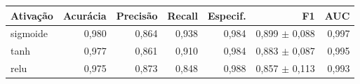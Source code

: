 \begin{tabular}{lrrrrrr}
\toprule
Ativação & Acurácia & Precisão & Recall & Especif. & F1 & AUC \\
\midrule
sigmoide & 0,980 & 0,864 & 0,938 & 0,984 & 0,899 $\pm$ 0,088 & 0,997 \\
tanh & 0,977 & 0,861 & 0,910 & 0,984 & 0,883 $\pm$ 0,087 & 0,995 \\
relu & 0,975 & 0,873 & 0,848 & 0,988 & 0,857 $\pm$ 0,113 & 0,993 \\
\bottomrule
\end{tabular}
